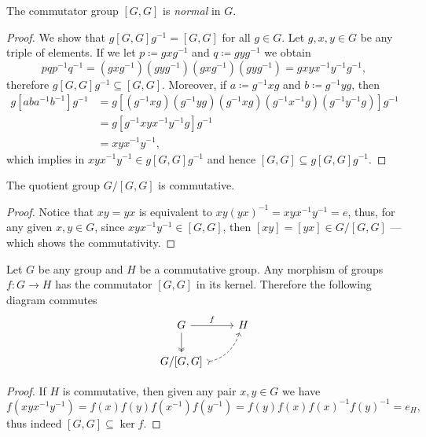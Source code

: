 \begin{lemma}
\label{lem:commutator-is-normal}
The commutator group \([G, G]\) is \emph{normal} in \(G\).
\end{lemma}

\begin{proof}
We show that \(g [G, G] g^{-1} = [G, G]\) for all \(g \in G\). Let \(g, x, y \in
G\) be any triple of elements. If we let \(p \coloneq g x g^{-1}\) and \(q
\coloneq g y g^{-1}\) we obtain
\[
p q p^{-1} q ^{-1}
= (g x g^{-1}) (g y g^{-1}) (g x g^{-1}) (g y g^{-1})
= g x y x^{-1} y^{-1} g^{-1},
\]
therefore \(g [G, G] g^{-1} \subseteq [G, G]\). Moreover, if \(a \coloneq g^{-1}
x g\) and \(b \coloneq g^{-1} y g\), then
\begin{align*}
g [a b a^{-1} b^{-1}] g^{-1}
&= g [
    (g^{-1} x g) (g^{-1} y g) (g^{-1} x g)
    (g^{-1} x^{-1} g) (g^{-1} y^{-1} g)
  ] g^{-1} \\
&= g [ g^{-1} x y x^{-1} y^{-1} g] g^{-1} \\
&= x y x^{-1} y^{-1},
\end{align*}
which implies in \(x y x^{-1} y^{-1} \in g [G, G] g^{-1}\) and hence \([G, G]
\subseteq g [G, G] g^{-1}\).
\end{proof}

\begin{lemma}
\label{lem:grp-modulo-commutator-is-commutative}
The quotient group \(G/[G, G]\) is commutative.
\end{lemma}

\begin{proof}
Notice that \(x y = y x\) is equivalent to \(x y (y x)^{-1} = x y x^{-1} y^{-1}
= e\), thus, for any given \(x, y \in G\), since \(x y x^{-1} y^{-1} \in [G,
G]\), then \([x y] = [y x] \in G/[G, G]\) --- which shows the commutativity.
\end{proof}

\begin{lemma}
\label{lem:commutator-kernel}
Let \(G\) be any group and \(H\) be a commutative group. Any morphism of groups
\(f: G \to H\) has the commutator \([G, G]\) in its kernel. Therefore the
following diagram commutes
\[
\begin{tikzcd}
G \ar[r, "f"] \ar[d, two heads]            & H \\
G/[G, G] \ar[ru, bend right, dashed, tail] &
\end{tikzcd}
\]
\end{lemma}

\begin{proof}
If \(H\) is commutative, then given any pair \(x, y \in G\) we have
\[
f(x y x^{-1} y^{-1})
= f(x) f(y) f(x^{-1}) f(y^{-1})
= f(y) f(x) f(x)^{-1} f(y)^{-1}
= e_H,
\]
thus indeed \([G, G] \subseteq \ker f\).
\end{proof}

